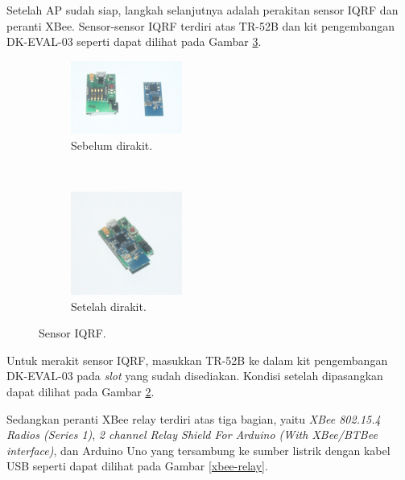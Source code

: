 			Setelah AP sudah siap, langkah selanjutnya adalah perakitan sensor IQRF dan peranti XBee. Sensor-sensor IQRF terdiri atas TR-52B dan kit pengembangan DK-EVAL-03 seperti dapat dilihat pada Gambar \ref{iqrf-node}.

			\begin{figure}[H]
				\begin{subfigure}[b]{\textwidth}
					\centering
				    \includegraphics[width=0.4\textwidth]{gambar/iqrf-node-stripped}
				    \caption{Sebelum dirakit.}
				    \label{iqrf-node-stripped}
				\end{subfigure}
				 ~
				\begin{subfigure}[b]{\textwidth}
					\centering
				    \includegraphics[width=0.4\textwidth]{gambar/iqrf-node-complete}
				    \caption{Setelah dirakit.}
				    \label{iqrf-node-complete}
				\end{subfigure}
				\caption{Sensor IQRF.}
				\label{iqrf-node}
			\end{figure}

			Untuk merakit sensor IQRF, masukkan TR-52B ke dalam kit pengembangan DK-EVAL-03 pada \emph{slot} yang sudah disediakan. Kondisi setelah dipasangkan dapat dilihat pada Gambar \ref{iqrf-node-complete}.

			Sedangkan peranti XBee relay terdiri atas tiga bagian, yaitu \emph{XBee 802.15.4 Radios (Series 1)}, \emph{2 channel Relay Shield For Arduino (With XBee/BTBee interface)}, dan Arduino Uno yang tersambung ke sumber listrik dengan kabel USB seperti dapat dilihat pada Gambar \ref{xbee-relay}.

